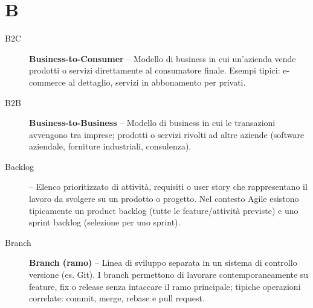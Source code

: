 \section*{B}
\begin{description}
    \item[B2C] \textbf{Business-to-Consumer} -- Modello di business in cui un'azienda vende prodotti o servizi direttamente al consumatore finale. Esempi tipici: e-commerce al dettaglio, servizi in abbonamento per privati.
    \item[B2B] \textbf{Business-to-Business} -- Modello di business in cui le transazioni avvengono tra imprese; prodotti o servizi rivolti ad altre aziende (software aziendale, forniture industriali, consulenza).
    \item[Backlog] -- Elenco prioritizzato di attività, requisiti o user story che rappresentano il lavoro da svolgere su un prodotto o progetto. Nel contesto Agile esistono tipicamente un product backlog (tutte le feature/attività previste) e uno sprint backlog (selezione per uno sprint).
    \item[Branch] \textbf{Branch (ramo)} -- Linea di sviluppo separata in un sistema di controllo versione (es. Git). I branch permettono di lavorare contemporaneamente su feature, fix o release senza intaccare il ramo principale; tipiche operazioni correlate: commit, merge, rebase e pull request.
\end{description}

